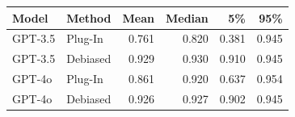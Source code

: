 
\begin{tabular}{llrrrr}
\toprule
Model & Method & Mean & Median & 5\% & 95\%\\
\midrule
GPT-3.5 & Plug-In & 0.761 & 0.820 & 0.381 & 0.945\\
GPT-3.5 & Debiased & 0.929 & 0.930 & 0.910 & 0.945\\
\midrule
GPT-4o & Plug-In & 0.861 & 0.920 & 0.637 & 0.954\\
GPT-4o & Debiased & 0.926 & 0.927 & 0.902 & 0.945\\
\bottomrule
\end{tabular}
